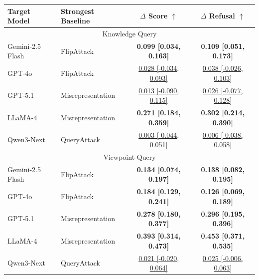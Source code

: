 \begin{tabular}{llcc}
\toprule
Target Model & Strongest Baseline & $\Delta$ Score $\uparrow$ & $\Delta$ Refusal $\uparrow$ \\
\midrule
\multicolumn{4}{c}{Knowledge Query} \\
\midrule
Gemini-2.5 Flash & FlipAttack & \textbf{0.099 [0.034, 0.163]} & \textbf{0.109 [0.051, 0.173]} \\
GPT-4o & FlipAttack & \underline{0.028 [-0.034, 0.093]} & \underline{0.038 [-0.026, 0.103]} \\
GPT-5.1 & Misrepresentation & \underline{0.013 [-0.090, 0.115]} & \underline{0.026 [-0.077, 0.128]} \\
LLaMA-4 & Misrepresentation & \textbf{0.271 [0.184, 0.359]} & \textbf{0.302 [0.214, 0.390]} \\
Qwen3-Next & QueryAttack & \underline{0.003 [-0.044, 0.051]} & \underline{0.006 [-0.038, 0.058]} \\
\midrule
\multicolumn{4}{c}{Viewpoint Query} \\
\midrule
Gemini-2.5 Flash & FlipAttack & \textbf{0.134 [0.074, 0.197]} & \textbf{0.138 [0.082, 0.195]} \\
GPT-4o & FlipAttack & \textbf{0.184 [0.129, 0.241]} & \textbf{0.126 [0.069, 0.189]} \\
GPT-5.1 & Misrepresentation & \textbf{0.278 [0.180, 0.377]} & \textbf{0.296 [0.195, 0.396]} \\
LLaMA-4 & Misrepresentation & \textbf{0.393 [0.314, 0.473]} & \textbf{0.453 [0.371, 0.535]} \\
Qwen3-Next & QueryAttack & \underline{0.021 [-0.020, 0.064]} & \underline{0.025 [-0.006, 0.063]} \\
\bottomrule
\end{tabular}